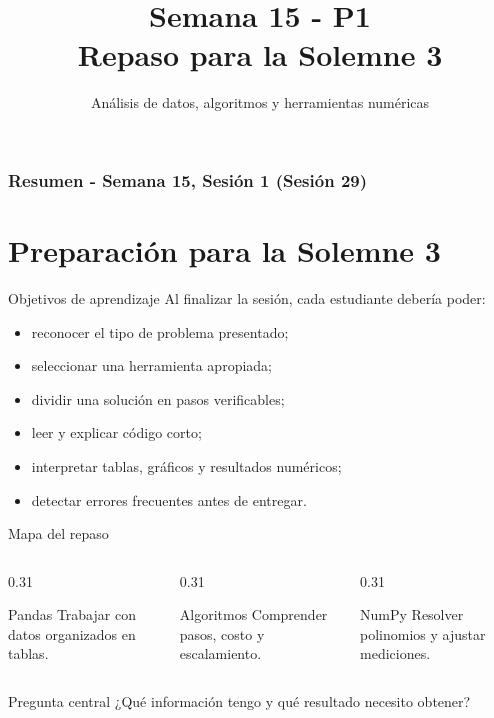 \documentclass[10pt]{beamer}
\title[Semana 15 - P1]{Semana 15 - P1\\Repaso para la Solemne 3}
\subtitle{Análisis de datos, algoritmos y herramientas numéricas}
\begin{document}
\myfront{}

\begin{frame}
  \titlepage
\end{frame}

\begin{frame}
  \frametitle{Resumen - Semana 15, Sesión 1 (Sesión 29)}
  \tableofcontents
\end{frame}


\section{Preparación para la Solemne 3}

\begin{frame}{Objetivos de aprendizaje}
  Al finalizar la sesión, cada estudiante debería poder:

  \begin{itemize}
    \item reconocer el tipo de problema presentado;
    \item seleccionar una herramienta apropiada;
    \item dividir una solución en pasos verificables;
    \item leer y explicar código corto;
    \item interpretar tablas, gráficos y resultados numéricos;
    \item detectar errores frecuentes antes de entregar.
  \end{itemize}
\end{frame}

\begin{frame}{Mapa del repaso}
  \begin{columns}
    \begin{column}{0.31\textwidth}
      \begin{block}{Pandas}
        Trabajar con datos organizados en tablas.
      \end{block}
    \end{column}
    \begin{column}{0.31\textwidth}
      \begin{block}{Algoritmos}
        Comprender pasos, costo y escalamiento.
      \end{block}
    \end{column}
    \begin{column}{0.31\textwidth}
      \begin{block}{NumPy}
        Resolver polinomios y ajustar mediciones.
      \end{block}
    \end{column}
  \end{columns}

  \vspace{0.5cm}
  \begin{alertblock}{Pregunta central}
    ¿Qué información tengo y qué resultado necesito obtener?
  \end{alertblock}
\end{frame}
\end{document}

